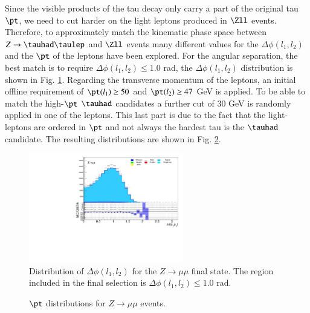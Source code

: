 Since the visible products of the tau decay only carry a part of the original tau $\pt$, we need to cut harder on the light leptons produced in $\Zll$ events. Therefore, to approximately match the kinematic phase space between  $Z\to\tauhad\taulep$ and $\Zll$ events many different values for the $\Delta\phi (l_1,l_2)$ and the $\pt$ of the leptons have been explored. For the angular separation, the best match is to require $\Delta\phi (l_1,l_2)\leq 1.0$ rad, the $\Delta\phi (l_1,l_2)$ distribution is shown in Fig. \ref{Fig8s}. Regarding the transverse momentum of the leptons, an initial offline requirement of $\pt(l_1)\geq 50$ and $\pt(l_2)\geq 47$ GeV is applied. To be able to match the high-$\pt$ $\tauhad$ candidates a further cut of 30 GeV is randomly applied in one of the leptons. This last part is due to the fact that the light-leptons are ordered in $\pt$ and not always the hardest tau is the $\tauhad$ candidate. The resulting distributions are shown in Fig. \ref{Fig9}.
\begin{figure}[htbp]	
	\centering
	\includegraphics[width=0.6\textwidth]{figures/Fig8.pdf}
	\caption{Distribution of $\Delta\phi (l_1,l_2)$ for the $Z\to\mu\mu$ final state. The region included in the final selection is $\Delta\phi (l_1,l_2)\leq 1.0$ rad.}
	\label{Fig8s}
\end{figure}
\begin{figure}[htbp]
	\centering
	\hfill
	\caption{$\pt$ distributions for $Z\to\mu\mu$ events.}
	\label{Fig9}
\end{figure}


